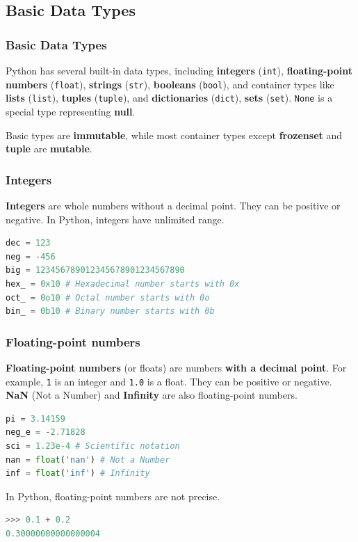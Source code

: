 \documentclass[beamer, en, version=2.0]{huangfusl-template}
\begin{document}
    \subsection{Basic Data Types}
    \begin{frame}[fragile]
        \frametitle{Basic Data Types}

        Python has several built-in data types, including \textbf{integers} ({\footnotesize\verb|int|}), \textbf{floating-point numbers} ({\footnotesize\verb|float|}), \textbf{strings} ({\footnotesize\verb|str|}), \textbf{booleans} ({\footnotesize\verb|bool|}), and container types like \textbf{lists} ({\footnotesize\verb|list|}), \textbf{tuples} ({\footnotesize\verb|tuple|}), and \textbf{dictionaries} ({\footnotesize\verb|dict|}), \textbf{sets} ({\footnotesize\verb|set|}). {\footnotesize\verb|None|} is a special type representing \textbf{null}.

        Basic types are \textbf{immutable}, while most container types except \textbf{frozenset} and \textbf{tuple} are \textbf{mutable}.
    \end{frame}
    \begin{frame}[fragile]
        \frametitle{Integers}

        \textbf{Integers} are whole numbers without a decimal point. They can be positive or negative. In Python, integers have unlimited range.

\begin{lstlisting}[language=python]
dec = 123
neg = -456
big = 123456789012345678901234567890
hex_ = 0x10 # Hexadecimal number starts with 0x
oct_ = 0o10 # Octal number starts with 0o
bin_ = 0b10 # Binary number starts with 0b
\end{lstlisting}
    \end{frame}
    \begin{frame}[fragile]
        \frametitle{Floating-point numbers}

        \textbf{Floating-point numbers} (or floats) are numbers \textbf{with a decimal point}. For example, {\footnotesize\verb|1|} is an integer and  {\footnotesize\verb|1.0|} is a float. They can be positive or negative. \textbf{NaN} (Not a Number) and \textbf{Infinity} are also floating-point numbers.

\begin{lstlisting}[language=python]
pi = 3.14159
neg_e = -2.71828
sci = 1.23e-4 # Scientific notation
nan = float('nan') # Not a Number
inf = float('inf') # Infinity
\end{lstlisting}

{\color{darkred}In Python, floating-point numbers are not precise.}
\begin{lstlisting}[language=python]
>>> 0.1 + 0.2
0.30000000000000004
\end{lstlisting}
    \end{frame}
\end{document}
